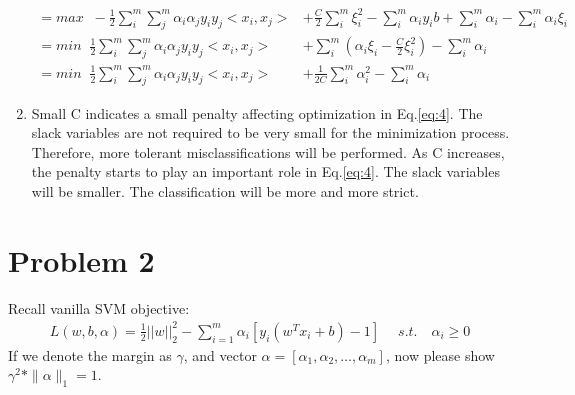 \documentclass[11pt]{article}
\begin{document}
\begin{enumerate}
\begin{equation}
\begin{aligned}
				=max\;\; -\frac{1}{2}\sum_{i}^{m}\sum_{j}^{m}\alpha_i\alpha_jy_iy_j<x_i,x_j>&+\frac{C}{2}\sum_{i}^{m}\xi_i^2-\sum_{i}^{m}\alpha_iy_ib+\sum_{i}^{m}\alpha_i-\sum_{i}^{m}\alpha_i\xi_i\\
				=min\;\;\frac{1}{2}\sum_{i}^{m}\sum_{j}^{m}\alpha_i\alpha_jy_iy_j<x_i,x_j>&+\sum_{i}^{m}\left(\alpha_i\xi_i-\frac{C}{2}\xi_i^2\right)-\sum_{i}^{m}\alpha_i\\
				=min\;\;\frac{1}{2}\sum_{i}^{m}\sum_{j}^{m}\alpha_i\alpha_jy_iy_j<x_i,x_j>&+\frac{1}{2C}\sum_{i}^{m}\alpha_i^2-\sum_{i}^{m}\alpha_i
			\end{aligned}
		\end{equation}
		\item
		Small C indicates a small penalty affecting optimization in Eq.\ref{eq:4}. The slack variables are not required to be very small for the minimization process. Therefore, more tolerant misclassifications will be performed. As C increases, the penalty starts to play an important role in Eq.\ref{eq:4}. The slack variables will be smaller. The classification will be more and more strict. 
	\end{enumerate}
	
	\section*{Problem 2}
	Recall vanilla SVM objective:
	\begin{equation}
		\begin{aligned}
			L(w,b,\alpha) = \frac{1}{2}||w||_2^2 - \sum\limits_{i=1}^{m}\alpha_i[y_i(w^Tx_i + b) - 1] \; \quad s.t. \quad \alpha_i \geq 0
		\end{aligned}
	\end{equation}
	If we denote the margin as $\gamma$, and vector $\alpha=[\alpha_1, \alpha_2, \dots, \alpha_m]$, now please show $\gamma^2*\|\alpha\|_1=1$.
\end{document}
